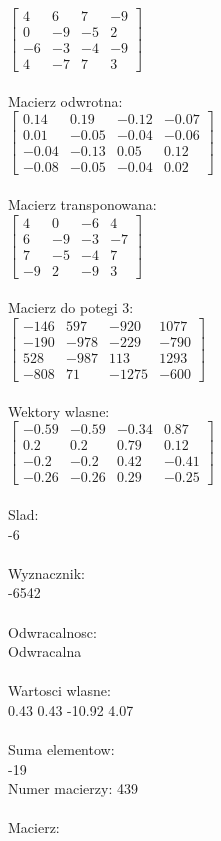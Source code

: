 \documentclass[a4paper,12pt]{article}
\begin{document}
$\begin{bmatrix} 4&6&7&-9\\0&-9&-5&2\\-6&-3&-4&-9\\4&-7&7&3 \end{bmatrix}$
\\
\\
Macierz odwrotna:\\

$\begin{bmatrix} 0.14&0.19&-0.12&-0.07\\0.01&-0.05&-0.04&-0.06\\-0.04&-0.13&0.05&0.12\\-0.08&-0.05&-0.04&0.02 \end{bmatrix}$
\\
\\
Macierz transponowana:\\

$\begin{bmatrix} 4&0&-6&4\\6&-9&-3&-7\\7&-5&-4&7\\-9&2&-9&3 \end{bmatrix}$
\\
\\
Macierz do potegi 3:\\

$\begin{bmatrix} -146&597&-920&1077\\-190&-978&-229&-790\\528&-987&113&1293\\-808&71&-1275&-600 \end{bmatrix}$
\\
\\
Wektory wlasne:\\

$\begin{bmatrix} -0.59&-0.59&-0.34&0.87\\0.2&0.2&0.79&0.12\\-0.2&-0.2&0.42&-0.41\\-0.26&-0.26&0.29&-0.25 \end{bmatrix}$
\\
\\
Slad:\\
-6
\\
\\
Wyznacznik:\\
-6542
\\
\\
Odwracalnosc:\\
Odwracalna
\\
\\
Wartosci wlasne:\\
0.43 0.43 -10.92 4.07
\\
\\
Suma elementow:\\
-19
\\
\newpage
Numer macierzy:
439
\\
\\
Macierz:\\
\end{document}
